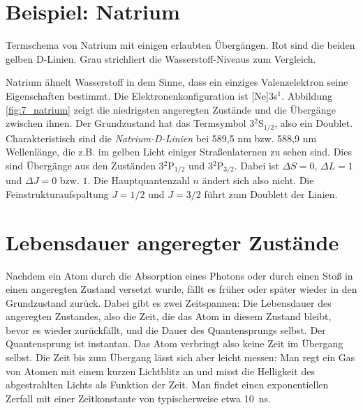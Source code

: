 \section{Beispiel: Natrium}

\begin{marginfigure}
    \caption{Termschema von Natrium mit einigen erlaubten Übergängen. Rot sind die beiden gelben D-Linien. Grau strichliert die Wasserstoff-Niveaus zum Vergleich.}
    \label{fig:7_natrium}
\end{marginfigure}

Natrium ähnelt Wasserstoff in dem Sinne, dass ein einziges Valenzelektron seine Eigenschaften bestimmt. Die Elektronenkonfiguration ist [Ne]3s$^1$. Abbildung  \ref{fig:7_natrium} zeigt die niedrigsten angeregten Zustände und die Übergänge zwischen ihnen. Der Grundzustand hat das Termsymbol 3$^2$S$_{1/2}$, also ein Doublet. Charakteristisch sind die \emph{Natrium-D-Linien} bei 589,5 nm bzw. 588,9 nm Wellenlänge, die z.B. im gelben Licht einiger Straßenlaternen zu sehen sind.
Dies sind Übergänge aus den Zuständen 3$^2$P$_{1/2}$ und 3$^2$P$_{3/2}$. Dabei ist $\Delta S = 0$, $\Delta L = 1$ und $\Delta J = 0$ bzw. $1$. Die Hauptquantenzahl $n$ ändert sich also nicht. Die Feinstrukturaufspaltung $J = 1/2$ und $J=3/2$ führt zum Doublett der Linien.

\section{Lebensdauer angeregter Zustände}

Nachdem ein Atom durch die Absorption eines Photons oder durch einen Stoß in einen angeregten Zustand versetzt wurde, fällt es früher oder später wieder in den Grundzustand zurück. Dabei gibt es zwei Zeitspannen: Die Lebensdauer des angeregten Zustandes, also die Zeit, die das Atom in diesem Zustand bleibt, bevor es wieder zurückfällt, und die Dauer des Quantensprungs selbst. Der Quantensprung ist instantan. Das Atom verbringt also keine Zeit im Übergang selbst. Die Zeit bis zum Übergang lässt sich aber leicht messen: Man regt ein Gas von Atomen mit einem kurzen Lichtblitz an und misst die Helligkeit des abgestrahlten Lichts als Funktion der Zeit. Man findet einen exponentiellen Zerfall mit einer Zeitkonstante von typischerweise etwa 10~ns.

